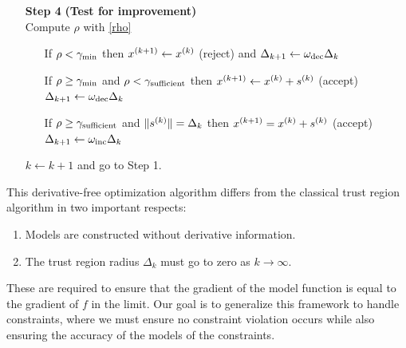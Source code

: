 \begin{algorithm}[H]
\begin{itemize}
        \item[\textbf{Step 4}] \textbf{(Test for improvement)} \\
            Compute $\rho$ with \cref{rho} \begin{itemize}
                \item[] If $\rho < \gamma_{\text{min}}$ then ${x}^{(k+1)} \gets {x}^{(k)}$ (reject) and $\Delta_{k+1} \gets \omega_{\text{dec}}\Delta_{k}$
                \item[] If $\rho \ge \gamma_{\text{min}}$ and $\rho < \gamma_{\text{sufficient}}$ then ${x}^{(k+1)}\gets{x}^{(k)}+{{s}^{(k)}}$ (accept) $\Delta_{k+1} \gets \omega_{\text{dec}}\Delta_{k}$
                \item[] If $\rho \ge \gamma_{\text{sufficient}}$ and $\|{{s}^{(k)}}\| = \Delta_{k}$ then ${x}^{(k+1)}={x}^{(k)}+{{s}^{(k)}}$ (accept) $\Delta_{k+1} \gets \omega_{\text{inc}}\Delta_{k}$
            \end{itemize}
            $k \gets k+1$ and go to Step 1.
    \end{itemize}
\end{algorithm}

This derivative-free optimization algorithm differs from the classical trust region algorithm in two important respects:
\begin{enumerate}
    \item Models are constructed without derivative information.
    \item The trust region radius $\Delta_k$ must go to zero as $k\to\infty$.
\end{enumerate}

These are required to ensure that the gradient of the model function is equal to the gradient of $f$ in the limit.
Our goal is to generalize this framework to handle constraints, where we must ensure no constraint violation occurs while also ensuring the accuracy of the models of the constraints.
% 
%   
  

